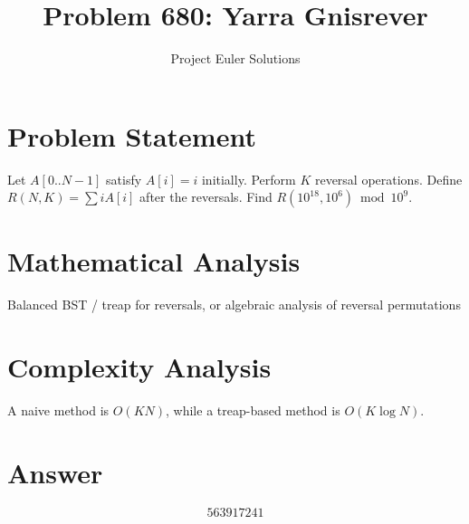 \documentclass[11pt]{article}
\title{Problem 680: Yarra Gnisrever}
\author{Project Euler Solutions}
\date{}
\begin{document}
\maketitle

\section{Problem Statement}

Let $A[0..N-1]$ satisfy $A[i]=i$ initially. Perform $K$ reversal operations. Define $R(N,K)=\sum iA[i]$ after the reversals. Find $R(10^{18}, 10^6)\bmod 10^9$.

\section{Mathematical Analysis}

Balanced BST / treap for reversals, or algebraic analysis of reversal permutations

\section{Complexity Analysis}

A naive method is $O(KN)$, while a treap-based method is $O(K \log N)$.

\section{Answer}

\[
\boxed{563917241}
\]
\end{document}
